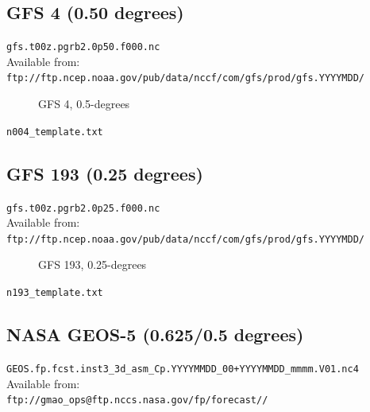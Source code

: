 \documentclass[11pt]{article}   %
\begin{document}
\clearpage
\subsection{GFS 4 (0.50 degrees)}

\verb|gfs.t00z.pgrb2.0p50.f000.nc|\\
Available from:\\
\verb|ftp://ftp.ncep.noaa.gov/pub/data/nccf/com/gfs/prod/gfs.YYYYMDD/|

\begin{figure}[htbp]\begin{center}
\parbox{15cm}{\caption{\label{FigNAM004}
GFS 4, 0.5-degrees
}}
\end{center}\end{figure}
\clearpage
\verb|n004_template.txt| \\
\tiny  \normalsize

\clearpage
\subsection{GFS 193 (0.25 degrees)}

\verb|gfs.t00z.pgrb2.0p25.f000.nc|\\
Available from:\\
\verb|ftp://ftp.ncep.noaa.gov/pub/data/nccf/com/gfs/prod/gfs.YYYYMDD/|

\begin{figure}[htbp]\begin{center}
\parbox{15cm}{\caption{\label{FigNAM002}
GFS 193, 0.25-degrees
}}
\end{center}\end{figure}
\clearpage
\verb|n193_template.txt| \\
\tiny  \normalsize


\clearpage
\subsection{NASA GEOS-5 (0.625/0.5 degrees)}

\verb|GEOS.fp.fcst.inst3_3d_asm_Cp.YYYYMMDD_00+YYYYMMDD_mmmm.V01.nc4|\\
Available from:\\
\verb|ftp://gmao_ops@ftp.nccs.nasa.gov/fp/forecast//|
\end{document}
